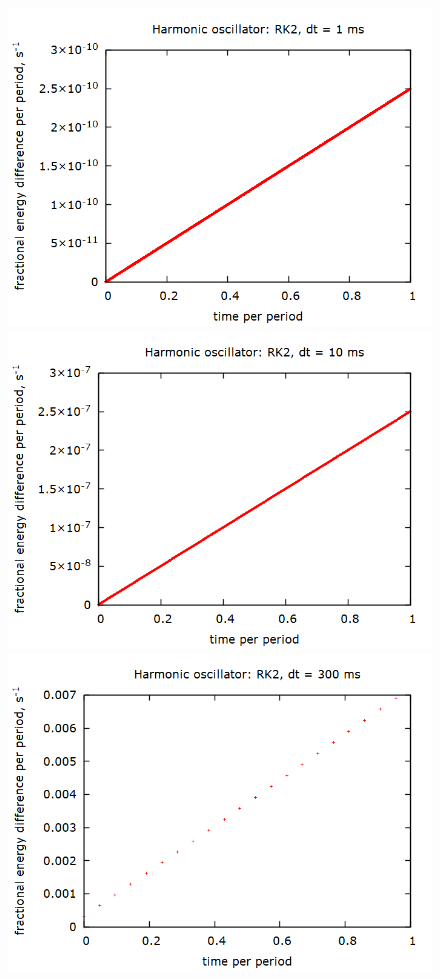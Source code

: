 \documentclass[aps,prl,twocolumn,superscriptaddress]{revtex4-1}
\begin{document}
\begin{figure}[htbp]
  	\begin{center}
 		\includegraphics[scale=0.3]{2_1.png}
 		\includegraphics[scale=0.3]{2_10.png}
 		\includegraphics[scale=0.3]{2_300.png}

\end{center}
\end{figure}
\end{document}
